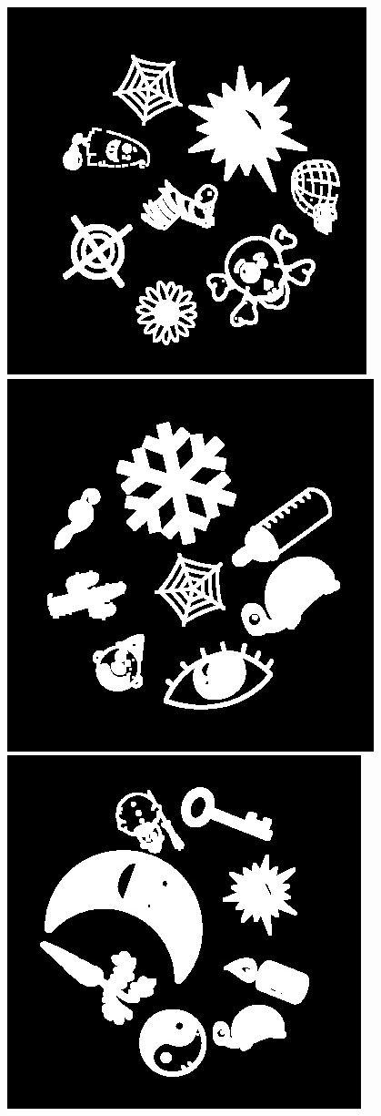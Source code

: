 \documentclass[10pt,a4paper]{article}
\begin{document}
\begin{center}
\includegraphics[scale=0.25]{2.1/0.jpg}
\includegraphics[scale=0.25]{2.1/1.jpg}
\includegraphics[scale=0.25]{2.1/2.jpg}

\end{center}
\end{document}
